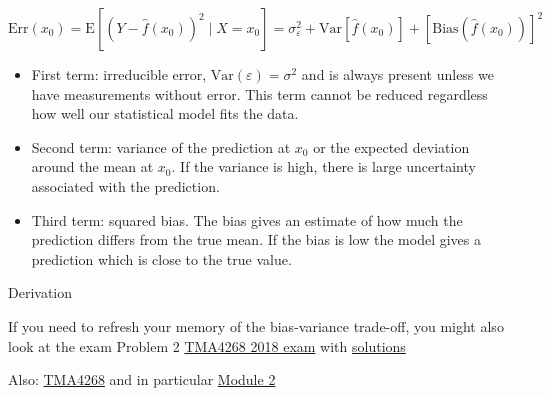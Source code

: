 \documentclass[
  ignorenonframetext,
]{beamer}
\providecommand{\tightlist}{%
  \setlength{\itemsep}{0pt}\setlength{\parskip}{0pt}}
\begin{document}
\begin{frame}

\[ \text{Err}(x_0)=\text{E}[(Y-\hat{f}(x_0))^2 \mid X=x_0]=\sigma_{\varepsilon}^2 +  \text{Var}[\hat{f}(x_0)]+[\text{Bias}(\hat{f}(x_0))]^2\]

\begin{itemize}
\tightlist
\item
  First term: irreducible error, \(\text{Var}(\varepsilon)=\sigma^2\)
  and is always present unless we have measurements without error. This
  term cannot be reduced regardless how well our statistical model fits
  the data.
\item
  Second term: variance of the prediction at \(x_0\) or the expected
  deviation around the mean at \(x_0\). If the variance is high, there
  is large uncertainty associated with the prediction.
\item
  Third term: squared bias. The bias gives an estimate of how much the
  prediction differs from the true mean. If the bias is low the model
  gives a prediction which is close to the true value.
\end{itemize}

\end{frame}

\begin{frame}

\begin{block}{Derivation}

If you need to refresh your memory of the bias-variance trade-off, you
might also look at the exam Problem 2
\href{https://www.math.ntnu.no/emner/TMA4268/Exam/V2018e.pdf}{TMA4268
2018 exam} with
\href{https://www.math.ntnu.no/emner/TMA4268/Exam/e2018sol.pdf}{solutions}

Also:
\href{https://www.math.ntnu.no/emner/TMA4268/2019v/TMA4268overview.html}{TMA4268}
and in particular
\href{https://www.math.ntnu.no/emner/TMA4268/2019v/2StatLearn/2StatLearn.html}{Module
2}

\end{block}

\end{frame}
\end{document}
